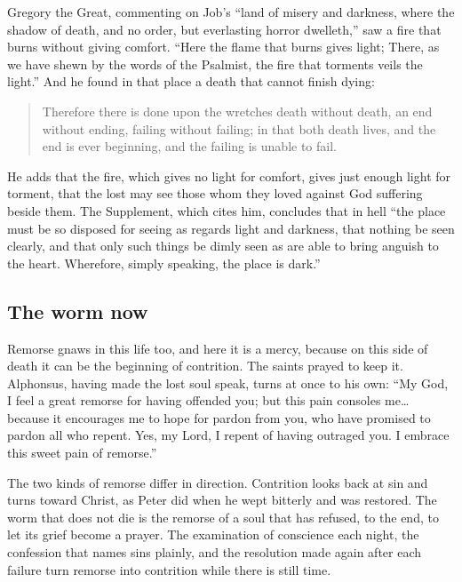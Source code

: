 Gregory the Great, commenting on Job's ``land of misery and darkness, where the shadow of death, and no order, but everlasting horror dwelleth,'' saw a fire that burns without giving comfort. ``Here the flame that burns gives light; There, as we have shewn by the words of the Psalmist, the fire that torments veils the light.'' And he found in that place a death that cannot finish dying:

\begin{quote}
Therefore there is done upon the wretches death without death, an end without ending, failing without failing; in that both death lives, and the end is ever beginning, and the failing is unable to fail.
\end{quote}

\noindent He adds that the fire, which gives no light for comfort, gives just enough light for torment, that the lost may see those whom they loved against God suffering beside them. The Supplement, which cites him, concludes that in hell ``the place must be so disposed for seeing as regards light and darkness, that nothing be seen clearly, and that only such things be dimly seen as are able to bring anguish to the heart. Wherefore, simply speaking, the place is dark.''

\subsection{The worm now}

Remorse gnaws in this life too, and here it is a mercy, because on this side of death it can be the beginning of contrition. The saints prayed to keep it. Alphonsus, having made the lost soul speak, turns at once to his own: ``My God, I feel a great remorse for having offended you; but this pain consoles me\ldots{} because it encourages me to hope for pardon from you, who have promised to pardon all who repent. Yes, my Lord, I repent of having outraged you. I embrace this sweet pain of remorse.''

The two kinds of remorse differ in direction. Contrition looks back at sin and turns toward Christ, as Peter did when he wept bitterly and was restored. The worm that does not die is the remorse of a soul that has refused, to the end, to let its grief become a prayer. The examination of conscience each night, the confession that names sins plainly, and the resolution made again after each failure turn remorse into contrition while there is still time.
